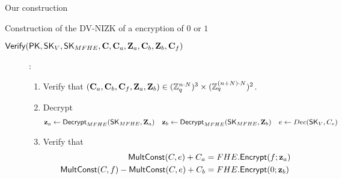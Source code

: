 \begin{section}{Our construction}
\begin{subsection}{Construction of the DV-NIZK of a encryption of $0$ or $1$}
\begin{description}
    \item[${\mathsf{Verify}}(\mathsf{PK}, \mathsf{SK}_{V}, \mathsf{SK}_{MFHE}, \mathbf{C}, \mathbf{C}_a, \mathbf{Z}_a, \mathbf{C}_b, \mathbf{Z}_b, \mathbf{C}_f)$]:
      \begin{enumerate}
      \item Verify that $(\mathbf{C}_a, \mathbf{C}_b, \mathbf{C}_f, \mathbf{Z}_a, \mathbf{Z}_b) \in (\mathbb{Z}_q^{n \cdot N})^3 \times (\mathbb{Z}_q^{(n+N)\cdot N})^2$.
      \item Decrypt
        \begin{align*}
          \mathbf{z}_a &\gets {\mathsf{Decrypt}}_{MFHE}(\mathsf{SK}_{MFHE}, \mathbf{Z}_a) & \mathbf{z}_b &\gets {\mathsf{Decrypt}}_{MFHE}(\mathsf{SK}_{MFHE}, \mathbf{Z}_b) & e &\gets Dec(\mathsf{SK}_{V}, C_e)
        \end{align*}
        
      \item Verify that
        \begin{align*}
          {\mathsf{MultConst}}(C, e)+C_a &= FHE.{\mathsf{Encrypt}}(f; \mathbf{z}_a) \\
          {\mathsf{MultConst}}(C, f) - {\mathsf{MultConst}}(C, e) + C_b &= FHE.{\mathsf{Encrypt}}(0; \mathbf{z}_b)
        \end{align*}
      \end{enumerate}
    \end{description}
    
    
  \end{subsection}



\end{section}

